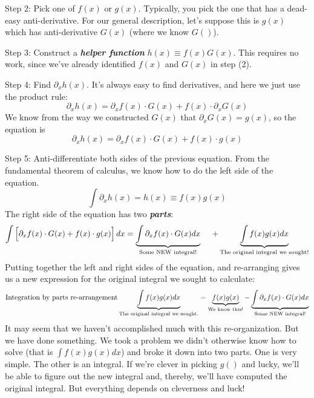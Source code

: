 \documentclass[
  letterpaper,
  DIV=11,
  numbers=noendperiod,
  oneside]{scrreprt}
\begin{document}
Step 2: Pick one of \(f(x)\) or \(g(x)\). Typically, you pick the one
that has a dead-easy anti-derivative. For our general description, let's
suppose this is \(g(x)\) which has anti-derivative \(G(x)\) (where we
know \(G()\)).

Step 3: Construct a \textbf{\emph{helper function}}
\(h(x) \equiv f(x) G(x)\). This requires no work, since we've already
identified \(f(x)\) and \(G(x)\) in step (2).

Step 4: Find \(\partial_x h(x)\). It's always easy to find derivatives,
and here we just use the product rule:
\[\partial_x h(x) = \partial_x f(x) \cdot G(x) + f(x)\cdot\partial_x G(x)\]
We know from the way we constructed \(G(x)\) that
\(\partial_x G(x) = g(x)\), so the equation is
\[\partial_x h(x) = \partial_x f(x) \cdot G(x) + f(x)\cdot g(x)\]

Step 5: Anti-differentiate both sides of the previous equation. From the
fundamental theorem of calculus, we know how to do the left side of the
equation. \[\int \partial_x h(x) = h(x) \equiv f(x)g(x)\] The right side
of the equation has two \textbf{\emph{parts}}:
\[\int \left[{\large\strut}\partial_x f(x) \cdot G(x) + f(x)\cdot g(x)\right]dx = \underbrace{\int \partial_x f(x) \cdot G(x) dx}_\text{Some NEW integral!}\ \ \ \  + \underbrace{\int f(x) g(x) dx}_\text{The original integral we sought!}\]
Putting together the left and right sides of the equation, and
re-arranging gives us a new expression for the original integral we
sought to calculate:
\[\text{Integration by parts re-arrangement}\\\underbrace{\int f(x) g(x) dx}_\text{The original integral we sought.} = \underbrace{f(x) g(x)}_\text{We know this!}  - \underbrace{\int \partial_x f(x) \cdot G(x) dx}_\text{Some NEW integral!}\]
It may seem that we haven't accomplished much with this re-organization.
But we have done something. We took a problem we didn't otherwise know
how to solve (that is \(\int f(x) g(x) dx\)) and broke it down into two
parts. One is very simple. The other is an integral. If we're clever in
picking \(g()\) and lucky, we'll be able to figure out the new integral
and, thereby, we'll have computed the original integral. But everything
depends on cleverness and luck!
\end{document}
